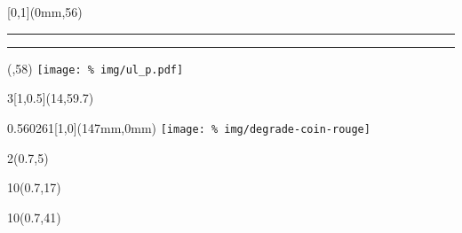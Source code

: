 \begin{frame}[plain]
  \begin{textblock*}{\paperwidth}[0,1](0mm,56\TPVertModule)
    \textcolor{rouge}{\rule{\banderougewidth}{\banderougeheight}}%
    \textcolor{or}{\rule{\bandeorwidth}{\bandeorheight}}           %
  \end{textblock*}

  \begin{textblock*}{\bandeorwidth}(\banderougewidth,58\TPVertModule)
    \texttt{[image: \%
      img/ul\_p.pdf]}
  \end{textblock*}
  \begin{textblock*}{3\TPHorizModule}[1,0.5](14\TPHorizModule,59.7\TPVertModule)
    \raggedleft\cfddfmt
  \end{textblock*}

  \begin{textblock*}{0.560261\imageheight}[1,0](147mm,0mm)
    \texttt{[image: \%
      img/degrade-coin-rouge]}
  \end{textblock*}

  \begin{textblock*}{2\TPHorizModule}(0.7\TPHorizModule,5\TPVertModule)
    \textcolor[rgb]{0.37,0.37,0.37}{\webinaire}
  \end{textblock*}

  \begin{textblock*}{10\TPHorizModule}(0.7\TPHorizModule,17\TPVertModule)
    \textcolor[cmyk]{0.67, 0.66, 0, 0.71}{\titlefmt}
  \end{textblock*}

  \begin{textblock*}{10\TPHorizModule}(0.7\TPHorizModule,41\TPVertModule)
    \textcolor[rgb]{0.37,0.37,0.37}{\datefmt}
  \end{textblock*}
\end{frame}
\endgroup
